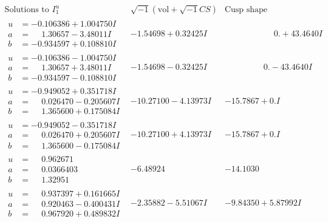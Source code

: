 \documentclass[1p]{elsarticle_modified}
\theoremstyle{definition}
\newcommand{\I}{\sqrt{-1}}
\begin{document}
$$\begin{array}{c|c|c}  
\text{Solutions to }I^u_{1}& \I (\text{vol} + \sqrt{-1}CS) & \text{Cusp shape}\\
 \hline 
\begin{aligned}
u &= -0.106386 + 1.004750 I \\
a &= \phantom{-}1.30657 - 3.48011 I \\
b &= -0.934597 + 0.108810 I\end{aligned}
 & -1.54698 + 0.32425 I & \phantom{-0.000000 -}0. + 43.4640 I \\ \hline\begin{aligned}
u &= -0.106386 - 1.004750 I \\
a &= \phantom{-}1.30657 + 3.48011 I \\
b &= -0.934597 - 0.108810 I\end{aligned}
 & -1.54698 - 0.32425 I & \phantom{-0.000000 } 0. - 43.4640 I \\ \hline\begin{aligned}
u &= -0.949052 + 0.351718 I \\
a &= \phantom{-}0.026470 - 0.205607 I \\
b &= \phantom{-}1.365600 + 0.175084 I\end{aligned}
 & -10.27100 - 4.13973 I & -15.7867 + 0. I\phantom{ +0.000000I} \\ \hline\begin{aligned}
u &= -0.949052 - 0.351718 I \\
a &= \phantom{-}0.026470 + 0.205607 I \\
b &= \phantom{-}1.365600 - 0.175084 I\end{aligned}
 & -10.27100 + 4.13973 I & -15.7867 + 0. I\phantom{ +0.000000I} \\ \hline\begin{aligned}
u &= \phantom{-}0.962671\phantom{ +0.000000I} \\
a &= \phantom{-}0.0366403\phantom{ +0.000000I} \\
b &= \phantom{-}1.32951\phantom{ +0.000000I}\end{aligned}
 & -6.48924\phantom{ +0.000000I} & -14.1030\phantom{ +0.000000I} \\ \hline\begin{aligned}
u &= \phantom{-}0.937397 + 0.161665 I \\
a &= \phantom{-}0.920463 - 0.400431 I \\
b &= \phantom{-}0.967920 + 0.489832 I\end{aligned}
 & -2.35882 - 5.51067 I & -9.84350 + 5.87992 I \\ \hline\begin{aligned}

\end{aligned}
\end{array}$$
\end{document}
